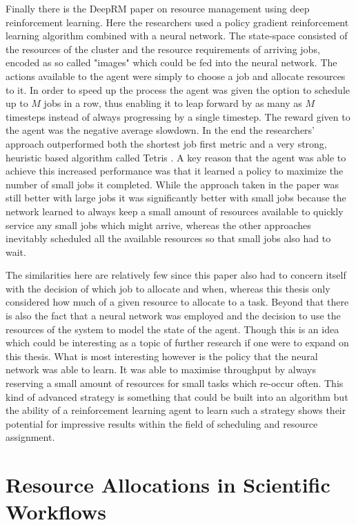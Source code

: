Finally there is the DeepRM \cite{DeepRM} paper on resource management using deep reinforcement learning. Here the researchers used a policy gradient reinforcement learning algorithm combined with a neural network. The state-space consisted of the resources of the cluster and the resource requirements of arriving jobs, encoded as so called "images" which could be fed into the neural network. The actions available to the agent were simply to choose a job and allocate resources to it. In order to speed up the process the agent was given the option to schedule up to $M$ jobs in a row, thus enabling it to leap forward by as many as $M$ timesteps instead of always progressing by a single timestep. The reward given to the agent was the negative average slowdown. In the end the researchers' approach outperformed both the shortest job first metric and a very strong, heuristic based algorithm called Tetris \cite{tetris}. A key reason that the agent was able to achieve this increased performance was that it learned a policy to maximize the number of small jobs it completed. While the approach taken in the paper was still better with large jobs it was significantly better with small jobs because the network learned to always keep a small amount of resources available to quickly service any small jobs which might arrive, whereas the other approaches inevitably scheduled all the available resources so that small jobs also had to wait.

The similarities here are relatively few since this paper also had to concern itself with the decision of which job to allocate and when, whereas this thesis only considered how much of a given resource to allocate to a task. Beyond that there is also the fact that a neural network was employed and the decision to use the resources of the system to model the state of the agent. Though this is an idea which could be interesting as a topic of further research if one were to expand on this thesis. What is most interesting however is the policy that the neural network was able to learn. It was able to maximise throughput by always reserving a small amount of resources for small tasks which re-occur often. This kind of advanced strategy is something that could be built into an algorithm but the ability of a reinforcement learning agent to learn such a strategy shows their potential for impressive results within the field of scheduling and resource assignment.

\section{Resource Allocations in Scientific Workflows}
\label{sec:workflow_allocation_papers}

